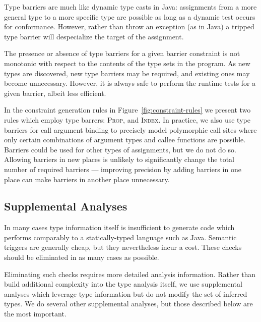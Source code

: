 Type barriers are much like dynamic type casts in Java: assignments from a
more general type to a more specific type are possible as long as a
dynamic test occurs for conformance.
However, rather than throw an exception (as in Java) a tripped type barrier will
despecialize the target of the assignment.

The presence or absence of type barriers for a given barrier constraint is not
monotonic with respect to the contents of the type sets in the program.  As
new types are discovered, new type barriers may be required, and existing ones
may become unnecessary.  However, it is always safe to perform the runtime
tests for a given barrier, albeit less efficient.

In the constraint generation rules in Figure~\ref{fig:constraint-rules} we
present two rules which employ type barrers:
\textsc{Prop}, and \textsc{Index}. In practice, we also use type barriers for
call argument binding to precisely model polymorphic call sites where
only certain combinations of argument types and callee functions are possible.
Barriers could be used for other types of assignments, but we do not do so.
Allowing barriers in new places is unlikely to significantly change the total
number of required barriers --- improving precision by adding barriers in one
place can make barriers in another place unnecessary.

\subsection{Supplemental Analyses}
\label{sec:supplemental-analyses}

In many cases type information itself is insufficient to generate code
which performs comparably to a statically-typed language such as Java.
Semantic triggers are generally cheap, but they nevertheless incur a cost.
These checks should be eliminated in as many cases as possible.

Eliminating such checks requires more detailed analysis information.
Rather than build additional complexity into the type analysis itself,
we use supplemental analyses which leverage type information but do not
modify the set of inferred types.
We do several other supplemental analyses, but those described below are the most important.

